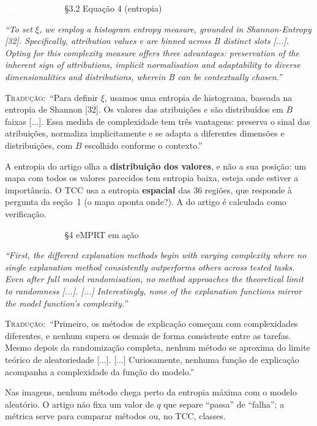 \documentclass[11pt,a4paper]{article}
\newcommand{\pagechip}[1]{{\setlength{\fboxsep}{1.5pt}\colorbox{cAcc}{\textcolor{white}{\scriptsize\texttt{#1}}}}}
\newenvironment{origquote}{\par\itshape\small}{\par}
\newenvironment{tradquote}{\par\small\textsc{Tradução:}\ }{\par}
\newcommand{\explab}[1]{\par\smallskip{\small\color{cAcc}\textbf{\MakeUppercase{#1}}}\par}
\begin{document}
\begin{citacard}{\pagechip{Hedström p. 5} §3.2 Equação 4 (entropia)}
\begin{origquote}“To set $\xi$, we employ a histogram entropy measure, grounded in Shannon-Entropy [32]. Specifically, attribution values e are binned across B distinct slots [...]. Opting for this complexity measure offers three advantages: preservation of the inherent sign of attributions, implicit normalisation and adaptability to diverse dimensionalities and distributions, wherein B can be contextually chosen.”\end{origquote}
\begin{tradquote}“Para definir $\xi$, usamos uma entropia de histograma, baseada na entropia de Shannon [32]. Os valores das atribuições $e$ são distribuídos em $B$ faixas [...]. Essa medida de complexidade tem três vantagens: preserva o sinal das atribuições, normaliza implicitamente e se adapta a diferentes dimensões e distribuições, com $B$ escolhido conforme o contexto.”\end{tradquote}
\explab{Explicação}
A entropia do artigo olha a \textbf{distribuição dos valores}, e não a sua posição: um mapa com todos os valores parecidos tem entropia baixa, esteja onde estiver a importância. O TCC usa a entropia \textbf{espacial} das 36 regiões, que responde à pergunta da seção~1 (o mapa aponta onde?). A do artigo é calculada como verificação.
\end{citacard}

\begin{citacard}{\pagechip{Hedström p. 6} §4 eMPRT em ação}
\begin{origquote}“First, the different explanation methods begin with varying complexity where no single explanation method consistently outperforms others across tested tasks. Even after full model randomisation, no method approaches the theoretical limit to randomness [...]. [...] Interestingly, none of the explanation functions mirror the model function's complexity.”\end{origquote}
\begin{tradquote}“Primeiro, os métodos de explicação começam com complexidades diferentes, e nenhum supera os demais de forma consistente entre as tarefas. Mesmo depois da randomização completa, nenhum método se aproxima do limite teórico de aleatoriedade [...]. [...] Curiosamente, nenhuma função de explicação acompanha a complexidade da função do modelo.”\end{tradquote}
\explab{Explicação}
Nas imagens, nenhum método chega perto da entropia máxima com o modelo aleatório. O artigo não fixa um valor de $q$ que separe “passa” de “falha”; a métrica serve para comparar métodos ou, no TCC, classes.
\end{citacard}
\end{document}
